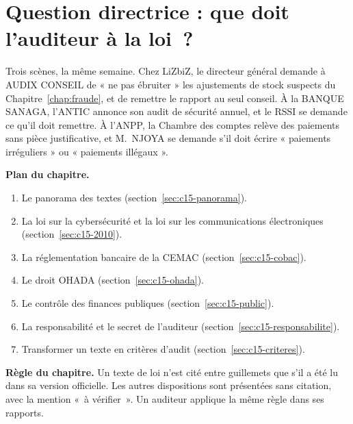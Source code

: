 \bigskip

\section*{Question directrice : que doit l'auditeur à la loi~?}

Trois scènes, la même semaine. Chez LiZbiZ, le directeur général demande à
AUDIX CONSEIL de « ne pas ébruiter » les ajustements de stock suspects
du Chapitre~\ref{chap:fraude}, et de remettre le rapport au seul conseil.
À la BANQUE SANAGA, l'ANTIC annonce son audit de sécurité annuel, et le RSSI
se demande ce qu'il doit remettre. À l'ANPP, la Chambre des comptes relève
des paiements sans pièce justificative, et M.~NJOYA se demande s'il doit
écrire « paiements irréguliers » ou « paiements illégaux ».

\medskip
\textbf{Plan du chapitre.}
\begin{enumerate}
    \item Le panorama des textes (section~\ref{sec:c15-panorama}).
    \item La loi sur la cybersécurité et la loi sur les communications électroniques (section~\ref{sec:c15-2010}).
    \item La réglementation bancaire de la CEMAC (section~\ref{sec:c15-cobac}).
    \item Le droit OHADA (section~\ref{sec:c15-ohada}).
    \item Le contrôle des finances publiques (section~\ref{sec:c15-public}).
    \item La responsabilité et le secret de l'auditeur (section~\ref{sec:c15-responsabilite}).
    \item Transformer un texte en critères d'audit (section~\ref{sec:c15-criteres}).
\end{enumerate}

\begin{boxalert}
\textbf{Règle du chapitre.} Un texte de loi n'est cité entre guillemets
que s'il a été lu dans sa version officielle. Les autres dispositions sont
présentées sans citation, avec la mention «~à vérifier~». Un auditeur
applique la même règle dans ses rapports.
\end{boxalert}

\separateur

